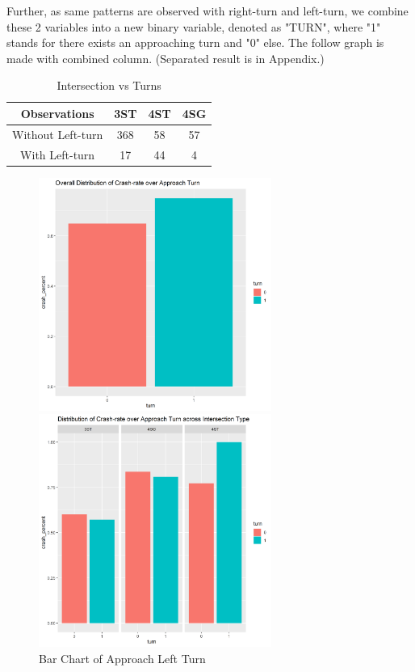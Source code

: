 \documentclass[11pt]{scrartcl} %
\begin{document}
Further, as same patterns are observed with right-turn and left-turn, we combine these 2 variables into a new binary variable, denoted as "TURN", where "1" stands for there exists an approaching turn and "0" else. The follow graph is made with combined column. (Separated result is in Appendix.)

\begin{table}[H]
\caption{Intersection vs Turns}
\centering
\begin{tabular}{|c|c|c|c|}
\hline
Observations      & 3ST & 4ST & 4SG \\
\hline
Without Left-turn & 368 & 58  & 57  \\
\hline
With Left-turn    & 17  & 44  & 4   \\
\hline
\end{tabular}
\end{table}


\begin{figure}[H]
\begin{minipage}[t]{0.5\linewidth}
\centering
\includegraphics[width=3in]{image/approach-turn-all.png}
\small
\end{minipage}
\begin{minipage}[t]{0.5\linewidth}
\centering
\includegraphics[width=3in]{image/approach-turn.png}
\small
\end{minipage}
\caption{Bar Chart of Approach Left Turn}
\end{figure}
\end{document}

